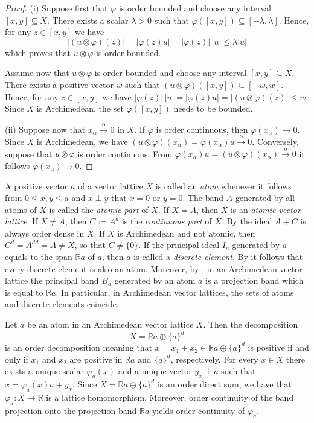\documentclass[12pt,reqno]{amsart}
\theoremstyle{plain}
\theoremstyle{definition}
\newcommand{\goeso}{\xrightarrow{\mathrm{o}}}	%
\begin{document}
\begin{proof}
(i) Suppose first that $\varphi$ is order bounded and choose any interval $[x,y]\subseteq X$. There exists a scalar $\lambda>0$ such that
$\varphi([x,y])\subseteq [-\lambda,\lambda]$. Hence, for any $z\in [x,y]$ we have
$$|(u\otimes \varphi)(z)|=|\varphi(z)u|= |\varphi(z)| \,|u| \leq \lambda |u|$$ which proves that $u\otimes \varphi$ is order bounded.

Assume now that $u\otimes \varphi$ is order bounded and choose any interval $[x,y]\subseteq X$. There exists a positive vector $w$ such that
$(u\otimes \varphi)([x,y]) \subseteq [-w,w]$. Hence, for any $z\in [x,y]$ we have
$|\varphi(z)|\,|u|=|\varphi(z)u|=|(u\otimes\varphi)(z)|\leq w$. Since $X$ is Archimedean, the set $\varphi([x,y])$ needs to be bounded.

(ii) Suppose now that $x_\alpha \goeso 0$ in $X$. If $\varphi$ is order continuous, then $\varphi(x_\alpha)\to 0$. Since $X$ is Archimedean, we have
$(u\otimes \varphi)(x_\alpha)=\varphi(x_\alpha)u \goeso 0$. Conversely, suppose that $u\otimes \varphi$ is order continuous. From $\varphi(x_\alpha)u=(u\otimes \varphi)(x_\alpha)\goeso 0$ it follows $\varphi(x_\alpha)\to 0$.
\end{proof}



A positive vector $a$ of a vector lattice $X$ is called an \emph{atom} whenever it follows from $0\leq x, y\leq  a$ and $x\perp y$ that $x=0$ or $y=0$. The band $A$ generated by all atoms of $X$ is called the \emph{atomic part} of $X$. If $X=A$, then $X$ is an \emph{atomic vector lattice}. If $X\neq A$, then $C:=A^d$ is the \emph{continuous part} of $X$. By \cite[Theorem 1.36]{Aliprantis:06} the ideal $A+C$ is always order dense in $X$. If $X$ is Archimedean and not atomic, then $C^d=A^{dd}=A\neq X$, so that $C\neq \{0\}$. If the principal ideal $I_a$ generated by $a$ equals to the span $\mathbb Ra$ of $a$, then $a$ is called a \emph{discrete element}. By \cite[Lemma 26.2]{LZ71} it follows that every discrete element is also an atom. Moreover, by \cite[Theorem 26.4]{LZ71}, in an Archimedean vector lattice  the principal band $B_a$ generated by an atom $a$ is a projection band which is equal to $\mathbb R a$. In particular, in Archimedean vector lattices, the sets of atoms and discrete elements coincide. 

Let $a$ be an atom in an Archimedean vector lattice $X$. Then the decomposition 
$$X=\mathbb Ra \oplus \{a\}^{d}$$ is an order decomposition meaning that $x=x_1+x_2\in \mathbb Ra \oplus \{a\}^{d}$ is positive if and only if $x_1$ and $x_2$ are positive in $\mathbb Ra$ and $\{a\}^d$, respectively. For every $x\in X$ there exists a unique scalar $\varphi_a(x)$ and a unique vector $y_x \perp a$ such that $x=\varphi_a(x)a + y_x$. Since $X=\mathbb Ra \oplus \{a\}^{d}$ is an order direct sum, we have that $\varphi_a\colon X\to\mathbb R$ is a lattice homomorphism. Moreover, order continuity of the band projection onto the projection band $\mathbb Ra$ yields order continuity of $\varphi_a$. 
\end{document}
